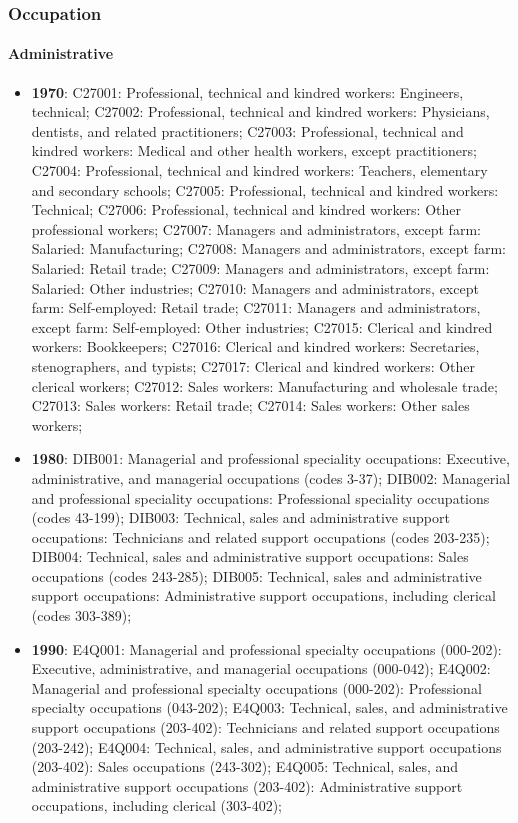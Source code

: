 \documentclass[a4paper]{article}
\begin{document}
\subsubsection{Occupation}
\paragraph{Administrative}
\begin{itemize}
   \item{\textbf{1970}:  C27001: Professional, technical and kindred workers: Engineers, technical; C27002: Professional, technical and kindred workers: Physicians, dentists, and related practitioners; C27003: Professional, technical and kindred workers: Medical and other health workers, except practitioners; C27004: Professional, technical and kindred workers: Teachers, elementary and secondary schools; C27005: Professional, technical and kindred workers: Technical; C27006: Professional, technical and kindred workers: Other professional workers; C27007: Managers and administrators, except farm: Salaried: Manufacturing; C27008: Managers and administrators, except farm: Salaried: Retail trade; C27009: Managers and administrators, except farm: Salaried: Other industries; C27010: Managers and administrators, except farm: Self-employed: Retail trade; C27011: Managers and administrators, except farm: Self-employed: Other industries; C27015: Clerical and kindred workers: Bookkeepers; C27016: Clerical and kindred workers: Secretaries, stenographers, and typists; C27017: Clerical and kindred workers: Other clerical workers; C27012: Sales workers: Manufacturing and wholesale trade; C27013: Sales workers: Retail trade; C27014: Sales workers: Other sales workers;}
   \item{\textbf{1980}:  DIB001: Managerial and professional speciality occupations: Executive, administrative, and managerial occupations (codes 3-37); DIB002: Managerial and professional speciality occupations: Professional speciality occupations (codes 43-199); DIB003: Technical, sales and administrative support occupations: Technicians and related support occupations (codes 203-235); DIB004: Technical, sales and administrative support occupations: Sales occupations (codes 243-285); DIB005: Technical, sales and administrative support occupations: Administrative support occupations, including clerical (codes 303-389);}
   \item{\textbf{1990}:  E4Q001: Managerial and professional specialty occupations (000-202): Executive, administrative, and managerial occupations (000-042); E4Q002: Managerial and professional specialty occupations (000-202): Professional specialty occupations (043-202); E4Q003: Technical, sales, and administrative support occupations (203-402): Technicians and related support occupations (203-242); E4Q004: Technical, sales, and administrative support occupations (203-402): Sales occupations (243-302); E4Q005: Technical, sales, and administrative support occupations (203-402): Administrative support occupations, including clerical (303-402);}

\end{itemize}
\end{document}
